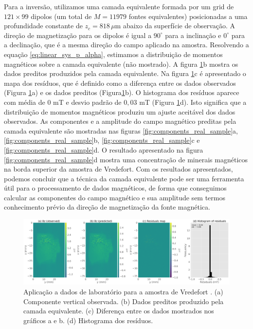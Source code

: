 Para a inversão, utilizamos uma camada equivalente formada por um grid de $121 \times 99$ dipolos (um total de $M=11979$ fontes equivalentes) posicionadas a uma profundidade constante de $z_c = 818 \, \mu$m abaixo da superfície de observação. A direção de magnetização para os dipolos é igual a $90^\circ$ para a inclinação e $0^\circ$ para a declinação, que é a mesma direção do campo aplicado na amostra. Resolvendo a equação \ref{eq:linear_sys_p_alpha}, estimamos a distribuição de momentos magnéticos sobre a camada equivalente (não mostrado). A figura \ref{fig:datafit_real_sample}b mostra os dados preditos produzidos pela camada equivalente. Na figura \ref{fig:datafit_real_sample}c é apresentado o mapa dos resíduos, que é definido como a diferença entre os dados observados (Figura \ref{fig:datafit_real_sample}a) e os dados preditos (Figura\ref{fig:datafit_real_sample}b). O histograma dos resíduos aparece com média de $0$ mT e desvio padrão de $0,03$ mT (Figura \ref{fig:datafit_real_sample}d). Isto significa que a distribuição de momentos magnéticos produziu um ajuste aceitável dos dados observados. As componentes e a amplitude do campo magnético preditas pela camada equivalente são mostradas nas figuras \ref{fig:components_real_sample}a, \ref{fig:components_real_sample}b, \ref{fig:components_real_sample}c e \ref{fig:components_real_sample}d. O resultado apresentado na figura \ref{fig:components_real_sample}d mostra uma concentração de minerais magnéticos na borda superior da amostra de Vredefort. Com os resultados apresentados, podemos concluir que a técnica da camada equivalente pode ser uma ferramenta útil para o processamento de dados magnéticos, de forma que conseguimos calcular as componentes do campo magnético e sua amplitude sem termos conhecimento prévio da direção de magnetização da fonte magnética. 

\begin{figure}
	\centering
	\includegraphics[width=.9\textwidth]{Fig/mag_vec/aplicacao_vredefort/results_data_fitting_Bz.png}
	\caption{Aplicação a dados de laboratório para a amostra de Vredefort \citep{araujo_etal2019_materials}. (a) Componente vertical observada. (b) Dados preditos produzido pela camada equivalente. (c) Diferença entre os dados mostrados nos gráficos a e b. (d) Histograma dos resíduos.}
	\label{fig:datafit_real_sample}
\end{figure}

